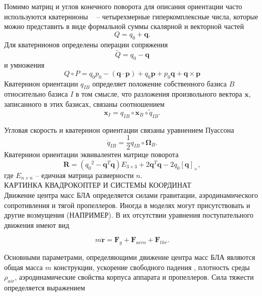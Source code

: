 Помимо матриц и углов конечного поворота для описания ориентации часто используются кватернионы ~\cite{Amelkin01} -- четырехмерные гиперкомплексные числа, которые можно представить в виде формальной суммы скалярной и векторной частей
	 \begin{equation} \label{eq:quat_def}
	 Q = q_0 + \bm{q}.
	 \end{equation}
	 Для кватернионов определены операции сопряжения
	 \begin{equation} \label{eq:quat_dual}
	 \tilde{Q} = q_0 - \bm{q}
	 \end{equation}
	 и умножения
\begin{equation} \label{eq:quat_mult}
Q \circ P = q_0 p_0 - (\bm{q} \cdot \bm{p})
+ q_0 \bm{p} + p_0 \bm{q} + \bm{q} \times \bm{p}
\end{equation}
Кватернион ориентации  $q_{IB}$ определяет положение собственного базиса {$B$} относительно базиса {$I$} в том смысле, что разложения произвольного вектора $\bm{x}$, записанного в этих базисах, связаны соотношением
	\begin{equation} \label{eq:quat}
	\bm{x}_I = q_{IB} \circ \bm{x}_B \circ \tilde{q}_{IB}.
	\end{equation}

	Угловая скорость и кватернион ориентации связаны уравнением Пуассона
	\begin{equation} \label{eq:puasson}
	\dot{q}_{IB} = \frac{1}{2} {q}_{IB} \circ \bm{\Omega}_B.
	\end{equation}
	Кватернион ориентации эквивалентен матрице поворота
	\begin{equation} \label{eq:quat_to_rotmx}
	\bm{R} = ({q_0}^2 - \bm{q}^T \bm{q}) E_{3 \times 3} + 2 \bm{q}^T \bm{q} - 2 {q_0} [\bm{q}]_{\times},
	\end{equation}
	где $E_{n \times n}$ -- едичная матрица размерности $n$.
\\
КАРТИНКА КВАДРОКОПТЕР И СИСТЕМЫ КООРДИНАТ
\\
Движение центра масс БЛА определяется силами гравитации, аэродинамического сопротивления и тягой пропеллеров. Иногда в моделях могут присутствовать и другие возмущения (НАПРИМЕР). В их отсутствии уравнения поступательного движения имеют вид

\begin{equation} \label{eq:common_traslational_motion}
m \ddot{\bm{r}} = \bm{F}_g + \bm{F}_{aero} + \bm{F}_{thr}.
\end{equation}

Основными параметрами, определяющими движение центра масс БЛА являются общая масса {$m$} конструкции, ускорение свободного падения , плотность среды {$\rho_{air}$}, аэродинамические свойства корпуса аппарата и пропеллеров. Сила тяжести определяется выражением

